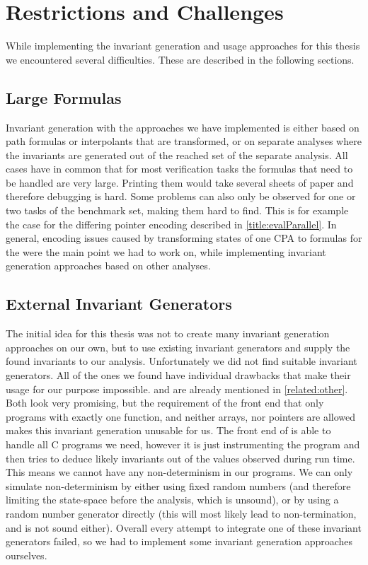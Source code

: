 \chapter{Restrictions and Challenges}
While implementing the invariant generation and usage approaches for this thesis we encountered several difficulties. These are described in the following sections.

\section{Large Formulas}
Invariant generation with the approaches we have implemented is either based on path formulas or interpolants that are transformed, or on separate analyses where the invariants are generated out of the 
reached set of the separate analysis. All cases have in common that for most verification tasks the formulas that need to be handled are very large. Printing them would take several sheets of paper and 
therefore debugging is hard. Some problems can also only be observed for one or two tasks of the benchmark set, making them hard to find. This is for example the case for the differing pointer encoding 
described in \autoref{title:evalParallel}. In general, encoding issues caused by transforming states of one \ac{CPA} to formulas for the \PredicateCPA{} were the main point we had to work on, while
implementing invariant generation approaches based on other analyses.

\section{External Invariant Generators}\label{restrictions:invgen}
The initial idea for this thesis was not to create many invariant generation approaches on our own, but to use existing invariant generators and supply the found invariants to our analysis. Unfortunately 
we did not find suitable invariant generators. All of the ones we found have individual drawbacks that make their usage for our purpose impossible. \InvGen{} and \Daikon{} are already mentioned in 
\autoref{related:other}. Both look very promising, but the requirement of the \InvGen{} front end that only programs with exactly one function, and neither arrays, nor pointers 
are allowed makes this invariant generation unusable for us. The front end of \Daikon{} is able to handle all C programs we need, however it is just instrumenting the program and then tries to deduce 
likely invariants out of the values observed during run time. This means we cannot have any non-determinism in our programs. We can only simulate non-determinism by either using fixed random numbers (and 
therefore limiting the state-space before the analysis, which is unsound), or by using a random number generator directly (this will most likely lead to non-termination, and is not sound either).
Overall every attempt to integrate one of these invariant generators failed, so we had to implement some invariant generation approaches ourselves.




